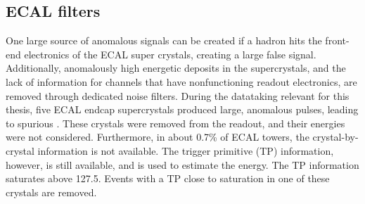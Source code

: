 \subsection*{ECAL filters}
\noindent
\justify
One large source of anomalous \ptmiss signals can be created if a hadron hits the front-end electronics of the ECAL super crystals, creating a large false signal.  
Additionally, anomalously high energetic deposits in the supercrystals, and the lack of information for channels that have nonfunctioning readout electronics, are removed through dedicated noise filters.
During the datataking relevant for this thesis, five ECAL endcap supercrystals produced large, anomalous pulses, leading to spurious \ptmiss. 
These crystals were removed from the readout, and their energies were not considered.
Furthermore, in about 0.7\% of ECAL towers, the crystal-by-crystal information is not available. 
The trigger primitive (TP) information, however, is still available, and is used to estimate the energy. 
The TP information saturates above 127.5\GeV. Events with a TP close to saturation in one of these crystals are removed.
